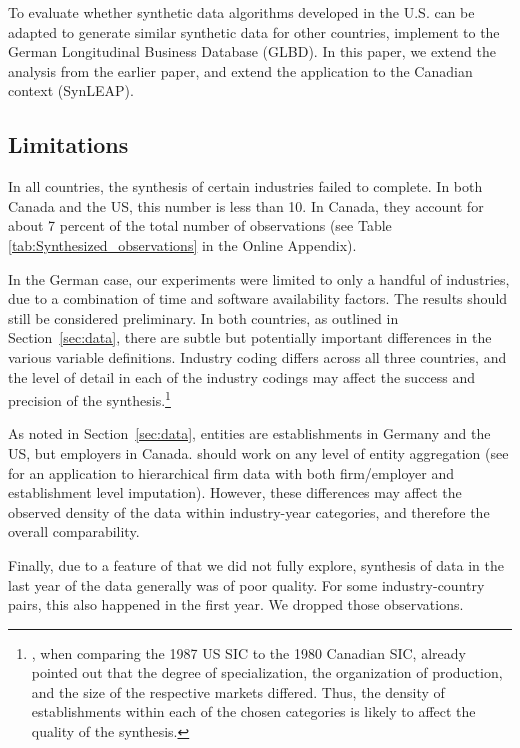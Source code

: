 To evaluate whether synthetic data algorithms developed in the U.S. can be adapted to generate similar synthetic data for other countries, \textcite{RePEc:cen:wpaper:14-13} implement \SynLBD{} to the German Longitudinal Business Database (GLBD). In this paper, we extend the analysis from the earlier paper, and extend the application to the Canadian context (SynLEAP). 

\subsection{Limitations}

In all countries, the synthesis of certain industries failed to complete. In both Canada and the US, this number is less than 10. In Canada, they account for about 7 percent of the total number of observations (see Table \ref{tab:Synthesized_observations} in the Online Appendix).

In the German case, our experiments were limited to only a handful of industries, due to a combination of time and software availability factors. The results should still be considered preliminary. In both countries, as outlined in Section~\ref{sec:data}, there are subtle but potentially important differences in the various variable definitions. Industry coding differs across all three countries, and the level of detail in each of the industry codings may affect the success and precision of the synthesis.\footnote{\textcite{StatisticsCanada1991}, when comparing the 1987 US \ac{SIC} to the 1980 Canadian \ac{SIC},  already pointed out that the degree of specialization, the organization of production, and the size of the respective markets differed. Thus, the density of establishments within each of the chosen categories is likely to affect the quality of the synthesis.} 

As noted in Section~\ref{sec:data}, entities are establishments in Germany and the US, but employers in Canada. \SynLBD{} should work on any level of entity aggregation (see \citet{RePEc:cen:wpaper:14-12} for an application to hierarchical firm data with both firm/employer and establishment level imputation). However, these differences may affect the observed density of the data within industry-year categories, and therefore the overall comparability. 

Finally, due to a feature of \SynLBD{} that we did not fully explore, synthesis of data in the last year of the data generally was of poor quality. For some industry-country pairs, this also happened in the first year. We dropped those observations. 

